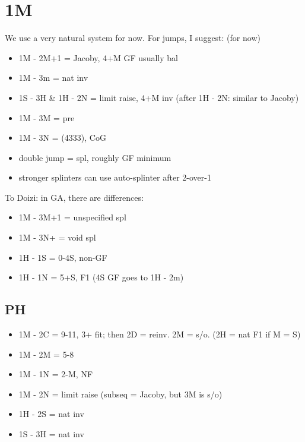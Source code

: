 \section{1M}

We use a very natural system for now. For jumps, I suggest: (for now)
\begin{itemize}
    \setlength\itemsep{0pt}
    \item 1M - 2M+1 = Jacoby, 4+M GF usually bal
    \item 1M - 3m = nat inv
    \item 1S - 3H \& 1H - 2N = limit raise, 4+M inv (after 1H - 2N: similar to Jacoby)
    \item 1M - 3M = pre
    \item 1M - 3N = (4333), CoG
    \item double jump = spl, roughly GF minimum
    \item stronger splinters can use auto-splinter after 2-over-1
\end{itemize}

{\color{RubineRed}
To Doizi: in GA, there are differences:
\begin{itemize}
    \setlength\itemsep{0pt}
    \item 1M - 3M+1 = unspecified spl
    \item 1M - 3N+ = void spl
    \item 1H - 1S = 0-4S, non-GF
    \item 1H - 1N = 5+S, F1 (4S GF goes to 1H - 2m)
\end{itemize}
}

\subsection{PH}

\begin{itemize}
    \setlength\itemsep{0pt}
    \item 1M - 2C = 9-11, 3+ fit; then 2D = reinv. 2M = s/o. (2H = nat F1 if M = S)
    \item 1M - 2M = 5-8
    \item 1M - 1N = 2-M, NF
    \item 1M - 2N = limit raise (subseq = Jacoby, but 3M is s/o)
    \item 1H - 2S = nat inv
    \item 1S - 3H = nat inv
\end{itemize}


